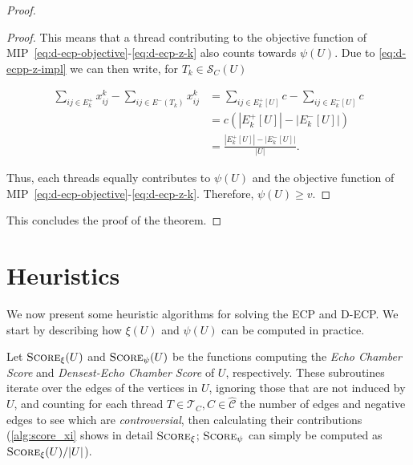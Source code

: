 \begin{proof}
\begin{proof}
		This means that a thread contributing to the objective function of
		MIP~\eqref{eq:d-ecp-objective}-\eqref{eq:d-ecp-z-k} also counts towards
		$\psi(U)$. Due to \eqref{eq:d-ecpp-z-impl} we can then write, for
		$T_k \in \mathcal{S}_C(U)$

		\begin{align*}
			\sum^{}_{ij \in E^+_k} x_{ij} ^{k} - \sum_{ij \in E^{-}
			(T_{k})} x_{ij} ^{k} & = \sum^{}_{ij \in E^{+}_k[U] } c - \sum_{ij \in E^{-}
			_k[U]} c                                                                     \\
			                     & = c (|E^{+}_{k}[U]| - |E^{-}_{k}[U]|)                 \\
			                     & = \frac{|E^{+}_{k}[U]| -
			|E^{-}_{k}[U]|}{|U|}.
		\end{align*}

		Thus, each threads equally contributes to $\psi(U)$ and the objective
		function of MIP~\eqref{eq:d-ecp-objective}-\eqref{eq:d-ecp-z-k}.
		Therefore, $\psi(U) \geq v$.
	\end{proof}

	This concludes the proof of the theorem.

\end{proof}

\section{Heuristics}%
\label{sub:approximation_algorithms}

We now present some heuristic algorithms for solving the \acrshort{ECP} and
\acrshort{D-ECP}. We start by describing how $\xi(U)$ and $\psi(U)$ can be
computed in practice.

Let $\textsc{Score}_{\xi} (U)$ and $\textsc{Score}_{\psi} (U)$ be the functions computing the
\emph{Echo Chamber Score} and \emph{Densest-Echo Chamber Score} of $U$,
respectively. These subroutines iterate over the edges of the vertices in $U$,
ignoring those that are not induced by $U$, and counting for each thread $T \in
	\mathcal{T}_{C}, C \in \mathcal{\hat{C}} $ the number of edges and negative edges
to see which are \emph{controversial}, then calculating their contributions
(\autoref{alg:score_xi} shows in detail $\textsc{Score}_\xi$;
$\textsc{Score}_\psi$ can simply be computed as $\textsc{Score}_\xi(U)/|U|$).


